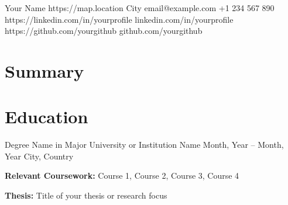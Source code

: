 \documentclass[11pt, a4paper]{article}
\begin{document}

\cvHeader
    {Your Name}
    {https://map.location}
    {City}
    {email@example.com}
    {+1 234 567 890}
    {https://linkedin.com/in/yourprofile}
    {linkedin.com/in/yourprofile}
    {https://github.com/yourgithub}
    {github.com/yourgithub}



\section{Summary}


\section{Education}
\cvEducation
    {Degree Name in Major}
    {University or Institution Name}
    {Month, Year – Month, Year}
    {City, Country}
    {
        \item \textbf{Relevant Coursework:} Course 1, Course 2, Course 3, Course 4
        \item \textbf{Thesis:} Title of your thesis or research focus
    }

\end{document}

